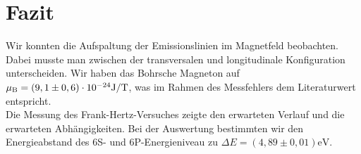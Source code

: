 \section{Fazit}
Wir konnten die Aufspaltung der Emissionslinien im Magnetfeld beobachten. Dabei musste man zwischen der transversalen und longitudinale Konfiguration unterscheiden. Wir haben das Bohrsche Magneton auf $\mu_\mathrm{B} = (9,1 \pm 0,6) \cdot 10^{-24} \si{\joule/\tesla}$, was im Rahmen des Messfehlers dem Literaturwert entspricht.\\
Die Messung des Frank-Hertz-Versuches zeigte den erwarteten Verlauf und die erwarteten Abhängigkeiten. Bei der Auswertung bestimmten wir den Energieabstand des 6S- und 6P-Energieniveau zu $\Delta E = (4,89 \pm 0,01) \si{\electronvolt}$. 